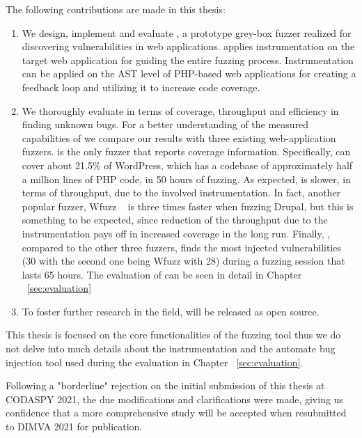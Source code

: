 The following contributions are made in this thesis:

\begin{enumerate}

\item We design, implement and evaluate \pname{}, a prototype grey-box fuzzer realized for discovering vulnerabilities in web applications. \pname{} applies instrumentation on the target web application for guiding the entire fuzzing process. Instrumentation can be applied on the AST level of PHP-based web applications for creating a feedback loop and utilizing it to increase code coverage.
\item We thoroughly evaluate \pname{} in terms of coverage, throughput and efficiency in finding unknown bugs. For a better understanding of the measured capabilities of \pname{} we compare our results with three existing web-application fuzzers. \pname{} is the only fuzzer that
reports coverage information. Specifically, \pname{} can cover about 21.5\% of WordPress, which has a codebase of approximately half a million lines of PHP code, in 50 hours of fuzzing. As expected, \pname{} is slower, in terms of throughput, due to the involved instrumentation. In fact, another popular fuzzer, Wfuzz ~\cite{wfuzz} is three times faster when fuzzing Drupal, but this is something to be expected, since reduction of the throughput due to the instrumentation pays off in increased coverage in the long run. Finally, \pname{}, compared to the other three fuzzers, finds the most injected vulnerabilities (30 with the second one being Wfuzz with 28) during a fuzzing session that lasts 65 hours. The evaluation of \pname{} can be seen in detail in Chapter ~\ref{sec:evaluation}
\item To foster further research in the field, \pname{} will be released as open source.

\end{enumerate}

This thesis is focused on the core functionalities of the fuzzing tool thus we do not delve into much details about the instrumentation and the automate bug injection tool used during the evaluation in Chapter ~\ref{sec:evaluation}.
 
Following a "borderline" rejection on the initial submission of this thesis at CODASPY 2021, the due modifications and clarifications were made, giving us confidence that a more comprehensive study will be accepted when resubmitted to DIMVA 2021 for publication.

